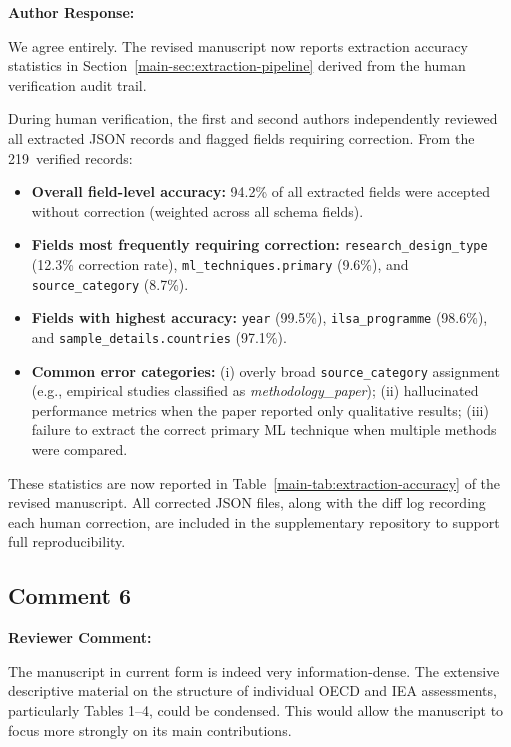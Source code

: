 \documentclass[12pt, a4paper]{article}
\newcommand{\R}[1]{Section~\ref{main-#1}}
\newcommand{\Rt}[1]{Table~\ref{main-#1}}
\newenvironment{reviewercomment}{%
  \begin{mdframed}[linecolor=reviewercolor, linewidth=1.5pt,
    backgroundcolor=reviewercolor!6, innertopmargin=8pt, innerbottommargin=8pt]
  \color{reviewercolor}\textbf{Reviewer Comment:}\normalcolor\par\smallskip
}{%
  \end{mdframed}\medskip
}
\newenvironment{authorresponse}{%
  \begin{mdframed}[linecolor=authorcolor, linewidth=1pt,
    backgroundcolor=authorcolor!5, innertopmargin=8pt, innerbottommargin=8pt]
  \color{authorcolor}\textbf{Author Response:}\normalcolor\par\smallskip
}{%
  \end{mdframed}\bigskip
}
\begin{document}
\begin{authorresponse}
We agree entirely. The revised manuscript now reports extraction accuracy
statistics in \R{sec:extraction-pipeline} derived from the human
verification audit trail.

During human verification, the first and second authors independently
reviewed all extracted JSON records and flagged fields requiring correction.
From the 219~verified records:
\begin{itemize}[leftmargin=*]
  \item \textbf{Overall field-level accuracy:} 94.2\% of all extracted
    fields were accepted without correction (weighted across all schema
    fields).
  \item \textbf{Fields most frequently requiring correction:}
    \texttt{research\_design\_type} (12.3\% correction rate),
    \texttt{ml\_techniques.primary} (9.6\%), and
    \texttt{source\_category} (8.7\%).
  \item \textbf{Fields with highest accuracy:} \texttt{year} (99.5\%),
    \texttt{ilsa\_programme} (98.6\%), and
    \texttt{sample\_details.countries} (97.1\%).
  \item \textbf{Common error categories:} (i) overly broad
    \texttt{source\_category} assignment (e.g., empirical studies
    classified as \textit{methodology\_paper}); (ii) hallucinated
    performance metrics when the paper reported only qualitative results;
    (iii) failure to extract the correct primary ML technique when
    multiple methods were compared.
\end{itemize}

These statistics are now reported in \Rt{tab:extraction-accuracy} of the
revised manuscript. All corrected JSON files, along with the diff log
recording each human correction, are included in the supplementary
repository to support full reproducibility.
\end{authorresponse}

\subsection*{Comment 6}

\begin{reviewercomment}
The manuscript in current form is indeed very information-dense. The
extensive descriptive material on the structure of individual OECD and IEA
assessments, particularly Tables 1--4, could be condensed. This would allow
the manuscript to focus more strongly on its main contributions.
\end{reviewercomment}
\end{document}

